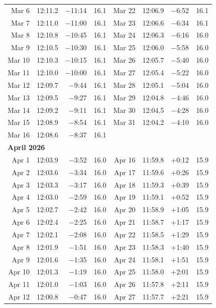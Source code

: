 {\begin{longtable}{r r r r | r r r r}
Mar 6 & 12:11.2 & $-$11:14 & 16.1 & Mar 22 & 12:06.9 & $-$6:52 & 16.1 \\
Mar 7 & 12:11.0 & $-$11:00 & 16.1 & Mar 23 & 12:06.6 & $-$6:34 & 16.1 \\
Mar 8 & 12:10.8 & $-$10:45 & 16.1 & Mar 24 & 12:06.3 & $-$6:16 & 16.0 \\
Mar 9 & 12:10.5 & $-$10:30 & 16.1 & Mar 25 & 12:06.0 & $-$5:58 & 16.0 \\
Mar 10 & 12:10.3 & $-$10:15 & 16.1 & Mar 26 & 12:05.7 & $-$5:40 & 16.0 \\
Mar 11 & 12:10.0 & $-$10:00 & 16.1 & Mar 27 & 12:05.4 & $-$5:22 & 16.0 \\
Mar 12 & 12:09.7 & $-$9:44 & 16.1 & Mar 28 & 12:05.1 & $-$5:04 & 16.0 \\
Mar 13 & 12:09.5 & $-$9:27 & 16.1 & Mar 29 & 12:04.8 & $-$4:46 & 16.0 \\
Mar 14 & 12:09.2 & $-$9:11 & 16.1 & Mar 30 & 12:04.5 & $-$4:28 & 16.0 \\
Mar 15 & 12:08.9 & $-$8:54 & 16.1 & Mar 31 & 12:04.2 & $-$4:10 & 16.0 \\
Mar 16 & 12:08.6 & $-$8:37 & 16.1 &  & & &  \\
\multicolumn{8}{l}{\textbf{April 2026}}\\
Apr 1 & 12:03.9 & $-$3:52 & 16.0 & Apr 16 & 11:59.8 & +0:12 & 15.9 \\
Apr 2 & 12:03.6 & $-$3:34 & 16.0 & Apr 17 & 11:59.6 & +0:26 & 15.9 \\
Apr 3 & 12:03.3 & $-$3:17 & 16.0 & Apr 18 & 11:59.3 & +0:39 & 15.9 \\
Apr 4 & 12:03.0 & $-$2:59 & 16.0 & Apr 19 & 11:59.1 & +0:52 & 15.9 \\
Apr 5 & 12:02.7 & $-$2:42 & 16.0 & Apr 20 & 11:58.9 & +1:05 & 15.9 \\
Apr 6 & 12:02.4 & $-$2:25 & 16.0 & Apr 21 & 11:58.7 & +1:17 & 15.9 \\
Apr 7 & 12:02.1 & $-$2:08 & 16.0 & Apr 22 & 11:58.5 & +1:29 & 15.9 \\
Apr 8 & 12:01.9 & $-$1:51 & 16.0 & Apr 23 & 11:58.3 & +1:40 & 15.9 \\
Apr 9 & 12:01.6 & $-$1:35 & 16.0 & Apr 24 & 11:58.1 & +1:51 & 15.9 \\
Apr 10 & 12:01.3 & $-$1:19 & 16.0 & Apr 25 & 11:58.0 & +2:01 & 15.9 \\
Apr 11 & 12:01.0 & $-$1:03 & 16.0 & Apr 26 & 11:57.8 & +2:11 & 15.9 \\
Apr 12 & 12:00.8 & $-$0:47 & 16.0 & Apr 27 & 11:57.7 & +2:21 & 15.9 \\

\end{longtable}}
